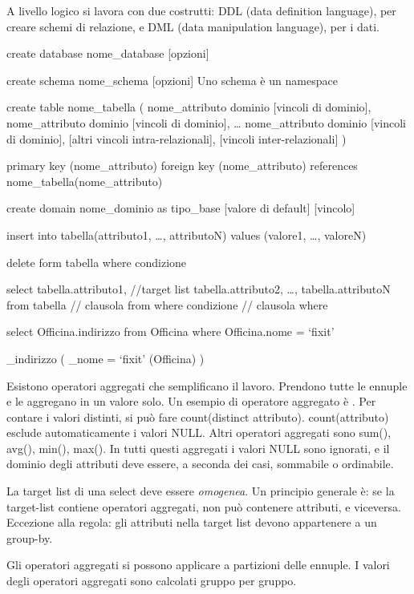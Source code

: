 A livello logico si lavora con due costrutti: DDL (data definition language), per creare schemi di relazione, e DML (data manipulation language), per i dati.

create database nome_database [opzioni]

create schema nome_schema [opzioni]
Uno schema \`e un namespace

create table nome_tabella ( 
    nome_attributo dominio [vincoli di dominio],
    nome_attributo dominio [vincoli di dominio],
    \ldots
    nome_attributo dominio [vincoli di dominio],
    [altri vincoli intra-relazionali],
    [vincoli inter-relazionali]
)

primary key (nome_attributo)
foreign key (nome_attributo) references nome_tabella(nome_attributo)

create domain nome_dominio as tipo_base
    [valore di default]
    [vincolo]

insert into tabella(attributo1, \ldots, attributoN)
values (valore1, \ldots, valoreN)

delete form tabella
where condizione

select  tabella.attributo1,     //target list
        tabella.attributo2,
        \ldots,
        tabella.attributoN
from tabella                    // clausola from
where condizione                // clausola where

select Officina.indirizzo
from Officina
where Officina.nome = `fixit'

\pi_{indirizzo} ( \sigma_{nome = `fixit'} (Officina) )

Esistono operatori aggregati che semplificano il lavoro. Prendono tutte le ennuple e le aggregano in un valore solo. Un esempio di operatore aggregato \`e . Per contare i valori distinti, si pu\`o fare count(distinct attributo). count(attributo) esclude automaticamente i valori NULL. Altri operatori aggregati sono sum(), avg(), min(), max(). In tutti questi aggregati i valori NULL sono ignorati, e il dominio degli attributi deve essere, a seconda dei casi, sommabile o ordinabile.

La target list di una select deve essere \emph{omogenea}. Un principio generale \`e: se la target-list contiene operatori aggregati, non pu\`o contenere attributi, e viceversa. Eccezione alla regola: gli attributi nella target list devono appartenere a un group-by.

Gli operatori aggregati si possono applicare a partizioni delle ennuple. I valori degli operatori aggregati sono calcolati gruppo per gruppo.


